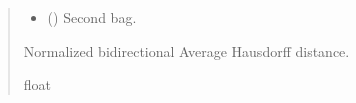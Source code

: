 \documentclass[letterpaper,10pt,english]{sphinxmanual}
\begin{document}
\begin{fulllineitems}
\begin{fulllineitems}
\begin{quote}
\begin{description}
\begin{itemize}
\item {} 
\sphinxAtStartPar
{} ({\hyperref[\detokenize{data/_autosummary/miml.data.bag.Bag:miml.data.bag.Bag}]{}}) \textendash{} Second bag.

\end{itemize}

\sphinxAtStartPar
Normalized bidirectional Average Hausdorff distance.

\sphinxAtStartPar
float

\end{description}\end{quote}

\end{fulllineitems}


\end{fulllineitems}




\renewcommand{\indexname}{Index}
\printindex
\end{document}

